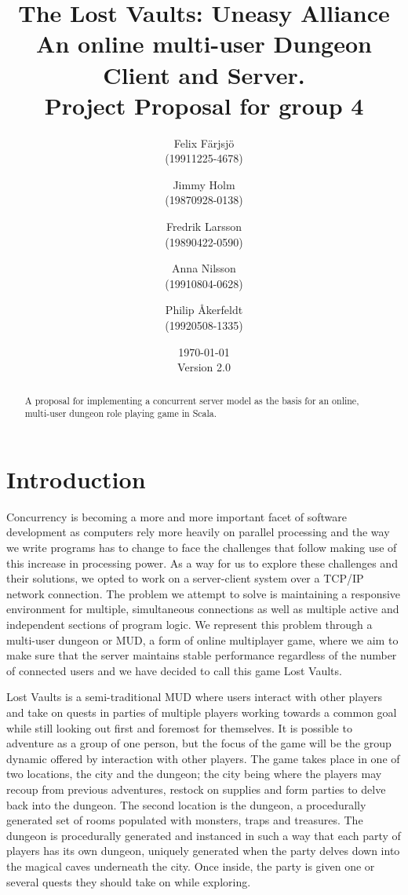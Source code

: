 \documentclass[a4paper]{article}
\title{The Lost Vaults: Uneasy Alliance\\\small{An online multi-user Dungeon Client and Server.}\\\small{Project Proposal for group 4}}
\author{Felix Färjsjö\\(19911225-4678) \and Jimmy Holm\\(19870928-0138) \and Fredrik Larsson\\(19890422-0590) \and Anna Nilsson\\(19910804-0628) \and Philip Åkerfeldt\\(19920508-1335)}
\date{\today\\Version 2.0}
\begin{document}
\maketitle
\newpage
\begin{abstract}
A proposal for implementing a concurrent server model as the basis for an online, multi-user dungeon role playing game in Scala.
\end{abstract}

\tableofcontents
\listoffigures
\newpage
\section{Introduction}
Concurrency is becoming a more and more important facet of software development as computers rely more heavily on parallel processing and the way we write programs has to change to face 
the challenges that follow making use of this increase in processing power. As a way for us to explore these challenges and their solutions, we opted to work on a server-client 
system over a TCP/IP network connection. The problem we attempt to solve is maintaining a responsive environment for multiple, simultaneous connections as well as multiple active and 
independent sections of program logic. We represent this problem through a multi-user dungeon or MUD, a form of online multiplayer game, where we aim to make sure that the server maintains 
stable performance regardless of the number of connected users and we have decided to call this game Lost Vaults.

Lost Vaults is a semi-traditional MUD where users interact with other players and take on quests in parties 
of multiple players working towards a common goal while still looking out first and foremost for themselves. It is possible to adventure as a group of one person, but the focus of the 
game will be the group dynamic offered by interaction with other players. 
The game takes place in one of two locations, the city and the dungeon; the city being where the players may recoup from previous adventures, restock on supplies and 
form parties to delve back into the dungeon. The second location is the dungeon, a procedurally generated set of rooms populated with monsters, traps and treasures.
The dungeon is procedurally generated and instanced in such a way that each party of players has its own dungeon, uniquely generated when the party delves down into 
the magical caves underneath the city. Once inside, the party is given one or several quests they should take on while exploring.
\end{document}
